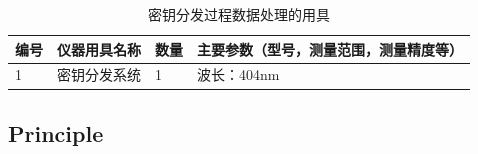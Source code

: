 \begin{table}[htbp]
	\centering
	\renewcommand\arraystretch{1.6}
	\caption{密钥分发过程数据处理的用具}
	\begin{tabular}{p{}|p{}|p{}|p{}}
		\hline
		编号& 仪器用具名称 & 数量 &  主要参数（型号，测量范围，测量精度等） \\
		\hline
		1	&	密钥分发系统 	& 1 & 波长：404nm	\\
		\hline
	\end{tabular}
\end{table}


\clearpage
\subsection{Principle}
